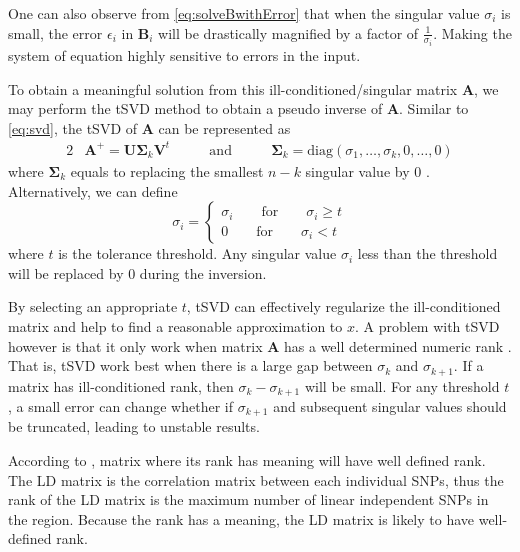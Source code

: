 \documentclass[12pt]{scrbook}
\begin{document}
One can also observe from \cref{eq:solveBwithError} that when the singular value $\sigma_i$ is small, the error $\epsilon_i$ in $\boldsymbol{B}_i$ will be drastically magnified by a factor of $\frac{1}{\sigma_i}$. 
Making the system of equation highly sensitive to errors in the input.

To obtain a meaningful solution from this ill-conditioned/singular matrix $\boldsymbol{A}$, we may perform the \gls{tSVD} method to obtain a pseudo inverse of $\boldsymbol{A}$.
Similar to \cref{eq:svd}, the \gls{tSVD} of $\boldsymbol{A}$ can be represented as 
\begin{alignat}{2}
&\boldsymbol{A}^+ = \boldsymbol{U\Sigma}_k\boldsymbol{V}^t  &\qquad\text{and}\qquad  &\boldsymbol{\Sigma}_k=\mathrm{diag}(\sigma_1,\dots,\sigma_k,0,\dots,0)
\label{eq:tsvd}				
\end{alignat}
where $\boldsymbol{\Sigma}_k$ equals to replacing the smallest $n-k$ singular value by 0 \citep{Hansen1987}. 
Alternatively, we can define
\begin{equation}
\sigma_i=\begin{cases}
\sigma_i\qquad\text{for}\qquad\sigma_i\ge t\\
0\qquad\text{for}\qquad\sigma_i<t
\end{cases}
\end{equation}
where $t$ is the tolerance threshold. 
Any singular value $\sigma_i$ less than the threshold will be replaced by 0 during the inversion.

By selecting an appropriate $t$, \gls{tSVD} can effectively regularize the ill-conditioned matrix and help to find a reasonable approximation to $x$. 
A problem with \gls{tSVD} however is that it only work when matrix $\boldsymbol{A}$ has a well determined numeric rank \citep{Hansen1987}.
That is, \gls{tSVD} work best when there is a large gap between $\sigma_k$ and $\sigma_{k+1}$.
If a matrix has ill-conditioned rank, then $\sigma_k-\sigma_{k+1}$ will be small.
For any threshold $t$, a small error can change whether if $\sigma_{k+1}$ and subsequent singular values should be truncated, leading to unstable results. 

According to \citet{Hansen1987}, matrix where its rank has meaning will have well defined rank. 
The \gls{LD} matrix is the correlation matrix between each individual \glspl{SNP}, thus the rank of the \gls{LD} matrix is the maximum number of linear independent \glspl{SNP} in the region.
Because the rank has a meaning, the \gls{LD} matrix is likely to have well-defined rank.
\end{document}
